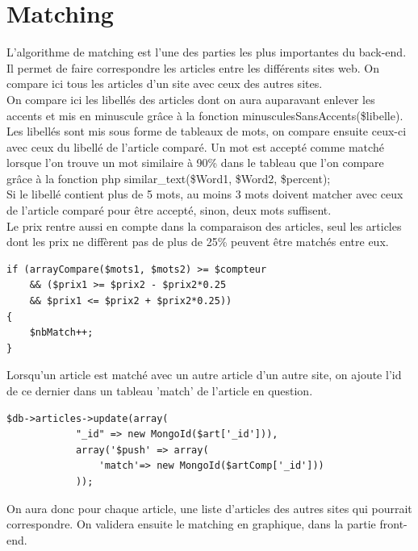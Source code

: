 \documentclass{report}
\begin{document}
\section{Matching}
L'algorithme de matching est l'une des parties les plus importantes du back-end. Il permet de faire correspondre les articles entre les différents sites web. On compare ici tous les articles d'un site avec ceux des autres sites.\\
On compare ici les libellés des articles dont on aura auparavant enlever les accents et mis en minuscule grâce à la fonction minusculesSansAccents(\$libelle). Les libellés sont mis sous forme de tableaux de mots, on compare ensuite ceux-ci avec ceux du libellé de l'article comparé. Un mot est accepté comme matché lorsque l'on trouve un mot similaire à 90\% dans le tableau que l'on compare grâce à la fonction php similar\_text(\$Word1, \$Word2, \$percent);\\
Si le libellé contient plus de 5 mots, au moins 3 mots doivent matcher avec ceux de l'article comparé pour être accepté, sinon, deux mots suffisent.\\
Le prix rentre aussi en compte dans la comparaison des articles, seul les articles dont les prix ne diffèrent pas de plus de 25\% peuvent être matchés entre eux.
\begin{lstlisting}
if (arrayCompare($mots1, $mots2) >= $compteur
	&& ($prix1 >= $prix2 - $prix2*0.25
	&& $prix1 <= $prix2 + $prix2*0.25))
{
	$nbMatch++;
}
\end{lstlisting}

Lorsqu'un article est matché avec un autre article d'un autre site, on ajoute l'id de ce dernier dans un tableau 'match' de l'article en question.
\begin{lstlisting}
$db->articles->update(array(
			"_id" => new MongoId($art['_id'])),
			array('$push' => array(
				'match'=> new MongoId($artComp['_id']))
			));          
\end{lstlisting}

On aura donc pour chaque article, une liste d'articles des autres sites qui pourrait correspondre. On validera ensuite le matching en graphique, dans la partie front-end.
\newpage
\end{document}

